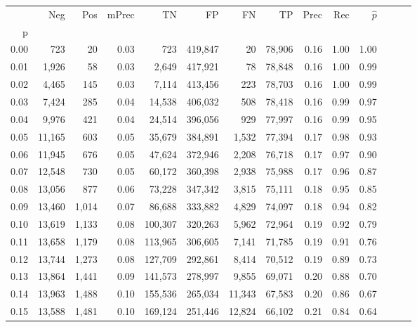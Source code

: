 \begin{tabular}{rrrrrrrrrrrrrr}
\toprule
{} &     Neg &    Pos & mPrec &       TN &       FP &      FN &      TP &  Prec &   Rec & $\hat{p}$ \\
p    &         &        &       &          &          &         &         &       &       &           \\
\midrule
0.00 &     723 &     20 &  0.03 &      723 &  419,847 &      20 &  78,906 &  0.16 &  1.00 &      1.00 \\
0.01 &   1,926 &     58 &  0.03 &    2,649 &  417,921 &      78 &  78,848 &  0.16 &  1.00 &      0.99 \\
0.02 &   4,465 &    145 &  0.03 &    7,114 &  413,456 &     223 &  78,703 &  0.16 &  1.00 &      0.99 \\
0.03 &   7,424 &    285 &  0.04 &   14,538 &  406,032 &     508 &  78,418 &  0.16 &  0.99 &      0.97 \\
0.04 &   9,976 &    421 &  0.04 &   24,514 &  396,056 &     929 &  77,997 &  0.16 &  0.99 &      0.95 \\
0.05 &  11,165 &    603 &  0.05 &   35,679 &  384,891 &   1,532 &  77,394 &  0.17 &  0.98 &      0.93 \\
0.06 &  11,945 &    676 &  0.05 &   47,624 &  372,946 &   2,208 &  76,718 &  0.17 &  0.97 &      0.90 \\
0.07 &  12,548 &    730 &  0.05 &   60,172 &  360,398 &   2,938 &  75,988 &  0.17 &  0.96 &      0.87 \\
0.08 &  13,056 &    877 &  0.06 &   73,228 &  347,342 &   3,815 &  75,111 &  0.18 &  0.95 &      0.85 \\
0.09 &  13,460 &  1,014 &  0.07 &   86,688 &  333,882 &   4,829 &  74,097 &  0.18 &  0.94 &      0.82 \\
0.10 &  13,619 &  1,133 &  0.08 &  100,307 &  320,263 &   5,962 &  72,964 &  0.19 &  0.92 &      0.79 \\
0.11 &  13,658 &  1,179 &  0.08 &  113,965 &  306,605 &   7,141 &  71,785 &  0.19 &  0.91 &      0.76 \\
0.12 &  13,744 &  1,273 &  0.08 &  127,709 &  292,861 &   8,414 &  70,512 &  0.19 &  0.89 &      0.73 \\
0.13 &  13,864 &  1,441 &  0.09 &  141,573 &  278,997 &   9,855 &  69,071 &  0.20 &  0.88 &      0.70 \\
0.14 &  13,963 &  1,488 &  0.10 &  155,536 &  265,034 &  11,343 &  67,583 &  0.20 &  0.86 &      0.67 \\
0.15 &  13,588 &  1,481 &  0.10 &  169,124 &  251,446 &  12,824 &  66,102 &  0.21 &  0.84 &      0.64 \\

\end{tabular}
